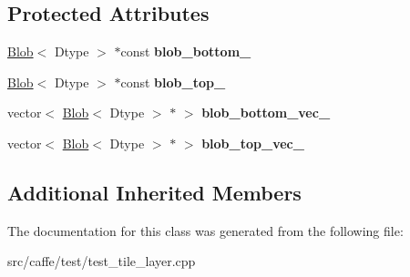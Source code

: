 \subsection*{Protected Attributes}
\begin{DoxyCompactItemize}
\item 
\mbox{\label{classcaffe_1_1_tile_layer_test_ac2416066212689a16c3ee2f259e0b664}} 
\mbox{\hyperlink{classcaffe_1_1_blob}{Blob}}$<$ Dtype $>$ $\ast$const {\bfseries blob\+\_\+bottom\+\_\+}
\item 
\mbox{\label{classcaffe_1_1_tile_layer_test_a8f13694aaf9e8f9661c971d863a149eb}} 
\mbox{\hyperlink{classcaffe_1_1_blob}{Blob}}$<$ Dtype $>$ $\ast$const {\bfseries blob\+\_\+top\+\_\+}
\item 
\mbox{\label{classcaffe_1_1_tile_layer_test_a4c4e29b77d0b30b9c355bd68cb980978}} 
vector$<$ \mbox{\hyperlink{classcaffe_1_1_blob}{Blob}}$<$ Dtype $>$ $\ast$ $>$ {\bfseries blob\+\_\+bottom\+\_\+vec\+\_\+}
\item 
\mbox{\label{classcaffe_1_1_tile_layer_test_a06fa0667f08f011ac43c0d4c73923c7c}} 
vector$<$ \mbox{\hyperlink{classcaffe_1_1_blob}{Blob}}$<$ Dtype $>$ $\ast$ $>$ {\bfseries blob\+\_\+top\+\_\+vec\+\_\+}
\end{DoxyCompactItemize}
\subsection*{Additional Inherited Members}


The documentation for this class was generated from the following file\+:\begin{DoxyCompactItemize}
\item 
src/caffe/test/test\+\_\+tile\+\_\+layer.\+cpp\end{DoxyCompactItemize}
